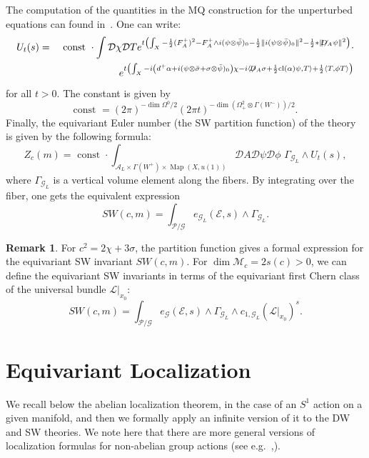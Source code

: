 \documentclass[a4paper,12pt,reqno,sumlimits]{amsart}
\theoremstyle{plain}
\theoremstyle{definition}
\newtheorem{rem}[thm]{Remark}
\newcommand{\1}{{\bf 1}}
\newcommand{\ex}[1]{{e^{#1}}}
\newcommand{\calA}{{\mathcal A}}
\newcommand{\calD}{{\mathcal D}}
\newcommand{\calE}{{\mathcal E}}
\newcommand{\calG}{{\mathcal G}}
\newcommand{\calM}{{\mathcal M}}
\newcommand{\calP}{{\mathcal P}}
\newcommand{\calL}{{\mathcal L}}
\newcommand{\Dirac}{\not\!\!D}
\newcommand{\Map}{\operatorname{Map}}
\newcommand{\cl}{{\operatorname{cl}}}
\newcommand{\ip}[1]{\langle #1 \rangle}
\newcommand{\norm}[1]{\| #1 \|}
\numberwithin{equation}{section}
\begin{document}
The computation of the quantities in the MQ construction for
the unperturbed equations can found in~\cite[Sec. 3.2]{radu}.
One can write:
\begin{eqnarray*}
  U_t(s)&=&\text{ const }\cdot\int\calD\chi\calD T
  \ex{t\left(\int_X-\frac{1}{2}(F^+_A)^2-
      F^+_A\wedge i(\psi\otimes\bar{\psi})_0
      -\frac{1}{2}\norm{i(\psi\otimes\bar{\psi})_0}^2
      -\frac{1}{2}*\norm{\Dirac_A\psi}^2\right)}\cdot\\
  &&\ex{t\left(\int_X -i\left(d^+\alpha+i(\psi\otimes\bar{\sigma}
        +\sigma\otimes\bar{\psi})_0\right)\chi
      -i\ip{\not\!D_A\sigma+\frac{1}{2}\cl(\alpha)\psi,T}
      +\frac{1}{2}\ip{T,\phi T}\right)}
\end{eqnarray*}
for all $t>0$. The constant is given by
$$
\text{const }=(2\pi)^{-\dim{\Omega^0}/2}
(2\pi t)^{-\dim(\Omega^2_+\otimes\Gamma(W^-))/2}.
$$
Finally, the equivariant Euler number (the SW partition function) of the
theory is given by the following formula:
$$
Z_c(m)=\text{ const }\cdot\int_{\calA_L\times\Gamma(W^+)\times\Map(X,u(1))}
\calD A\calD\psi\calD\phi\,\,\Gamma_{\calG_L}\wedge U_t(s),
$$
where $\Gamma_{\calG_L}$ is a vertical volume element along the fibers.  By
integrating over the fiber, one gets the equivalent expression
$$
SW(c,m)=\int_{\calP/\calG} e_{\calG_L}(\calE,s)\wedge\Gamma_{\calG_L}.
$$
\begin{rem}
  For $c^2=2\chi+3\sigma$, the partition function gives a formal expression
  for the equivariant SW invariant $SW(c,m)$.  For $\dim\calM_c=2s(c)>0$, we
  can define the equivariant SW invariants in terms of the equivariant first
  Chern class of the universal bundle $\calL\big|_{x_0}$:
  $$
  SW(c,m)=\int_{\calP/\calG} e_{\calG}(\calE,s)\wedge\Gamma_{\calG_L}
  \wedge c_{1, \calG_L}(\calL\big|_{x_0})^s.
  $$
\end{rem}



\section{Equivariant Localization} 
\label{equivloc}

We recall below the abelian localization theorem, in the case of an $S^1$
action on a given manifold, and then we formally apply an infinite version of
it to the DW and SW theories.  We note here that there are more general
versions of localization formulas for non-abelian group actions (see
e.g.~\cite{bgv},\cite{guillemin}).
\end{document}
